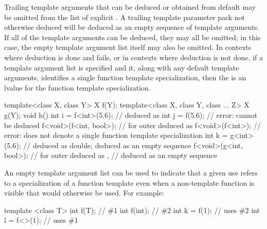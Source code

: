 \pnum
Trailing template arguments that can be deduced or
obtained from default
may be omitted from the list of explicit
.
A trailing template parameter pack not otherwise deduced will be
deduced as an empty sequence of template arguments.
If all of the template arguments can be deduced, they may all be omitted;
in this case, the empty template argument list
\tcode{<>}
itself may also be omitted.
In contexts where deduction is done and fails, or in contexts where
deduction is not done, if a template argument list is specified and it,
along with any default template arguments, identifies a single function
template specialization, then the
is an lvalue for the function template specialization.
\begin{example}
\begin{codeblock}
template<class X, class Y> X f(Y);
template<class X, class Y, class ... Z> X g(Y);
void h() {
  int i = f<int>(5.6);          //  deduced as 
  int j = f(5.6);               // error:  cannot be deduced
  f<void>(f<int, bool>);        //  for outer  deduced as 
  f<void>(f<int>);              // error:  does not denote a single function template specialization
  int k = g<int>(5.6);          //  deduced as double;  deduced as an empty sequence
  f<void>(g<int, bool>);        //  for outer  deduced as ,
                                //  deduced as an empty sequence
}
\end{codeblock}
\end{example}

\pnum
\begin{note}
An empty template argument list can be used to indicate that a given
use refers to a specialization of a function template even when a
non-template function is visible that would otherwise be used.
For example:

\begin{codeblock}
template <class T> int f(T);    // \#1
int f(int);                     // \#2
int k = f(1);                   // uses \#2
int l = f<>(1);                 // uses \#1
\end{codeblock}
\end{note}

